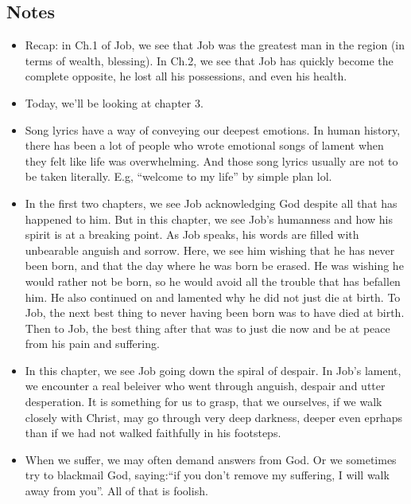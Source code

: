 \subsection*{Notes}
\begin{itemize}
  \item{Recap: in Ch.1 of Job, we see that Job was the greatest man in the
  region (in terms of wealth, blessing). In Ch.2, we see that Job has quickly
  become the complete opposite, he lost all his possessions, and even his
  health. }
  \item{Today, we'll be looking at chapter 3.}
  \item{Song lyrics have a way of conveying our deepest emotions. In human
  history, there has been a lot of people who wrote emotional songs of lament
  when they felt like life was overwhelming. And those song lyrics usually
  are not to be taken literally. E.g, ``welcome to my life'' by simple plan
  lol.}
  \item{In the first two chapters, we see Job acknowledging God despite all
  that has happened to him. But in this chapter, we see Job's humanness and
  how his spirit is at a breaking point. As Job speaks, his words are filled
  with unbearable anguish and sorrow. Here, we see him wishing that he has
  never been born, and that the day where he was born be erased. He was
  wishing he would rather not be born, so he would avoid all the trouble that
  has befallen him. He also continued on and lamented why he did not just die
  at birth. To Job, the next best thing to never having been born was to have
  died at birth. Then to Job, the best thing after that was to just die now
  and be at peace from his pain and suffering.}
  \item{In this chapter, we see Job going down the spiral of despair. In
  Job's lament, we encounter a real beleiver who went through anguish, despair
  and utter desperation. It is something for us to grasp, that we ourselves,
  if we walk closely with Christ, may go through very deep darkness, deeper
  even eprhaps than if we had not walked faithfully in his footsteps.}
  \item{When we suffer, we may often demand answers from God. Or we sometimes
  try to blackmail God, saying:``if you don't remove my suffering, I will
  walk away from you''. All of that is foolish. }
\end{itemize}
